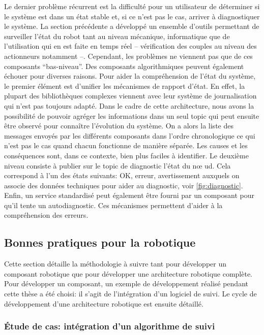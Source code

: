 Le dernier problème récurrent est la difficulté pour un utilisateur de
déterminer si le système est dans un état stable et, si ce n'est pas le
cas, arriver à diagnostiquer le système. La section précédente a
développé un ensemble d'outils permettant de surveiller l'état du
robot tant au niveau mécanique, informatique que de l'utilisation qui
en est faite en temps réel -- vérification des couples au niveau des
actionneurs notamment --. Cependant, les problèmes ne viennent pas que
de ces composants ``bas-niveau''. Des composants algorithmiques
peuvent également échouer pour diverses raisons. Pour aider la
compréhension de l'état du système, le premier élément est d'unifier
les mécanismes de rapport d'état. En effet, la plupart des
bibliothèques complexes viennent avec leur système de journalisation
qui n'est pas toujours adapté. Dans le cadre de cette architecture,
nous avons la possibilité de pouvoir agréger les informations dans un
seul topic qui peut ensuite être observé pour connaître l'évolution du
système. On a alors la liste des messages envoyés par les différents
composants dans l'ordre chronologique ce qui n'est pas le cas quand
chacun fonctionne de manière séparée. Les causes et les conséquences
sont, dans ce contexte, bien plus faciles à identifier. Le deuxième
niveau consiste à publier sur le topic de diagnostic l'état du n\oe
ud. Cela correspond à l'un des états suivants: OK, erreur,
avertissement auxquels on associe des données techniques pour aider au
diagnostic, voir \autoref{fig:diagnostic}. Enfin, un service
standardisé peut également être fourni par un composant pour qu'il
tente un autodiagnostic. Ces mécanismes permettent d'aider à la
compréhension des erreurs.



\subsection{Bonnes pratiques pour la robotique}

Cette section détaille la méthodologie à suivre tant pour développer
un composant robotique que pour développer une architecture robotique
complète. Pour développer un composant, un exemple de développement
réalisé pendant cette thèse a été choisi: il s'agit de l'intégration
d'un logiciel de suivi. Le cycle de développement d'une architecture robotique est ensuite détaillé.


\subsubsection{Étude de cas: intégration d'un algorithme de suivi}

